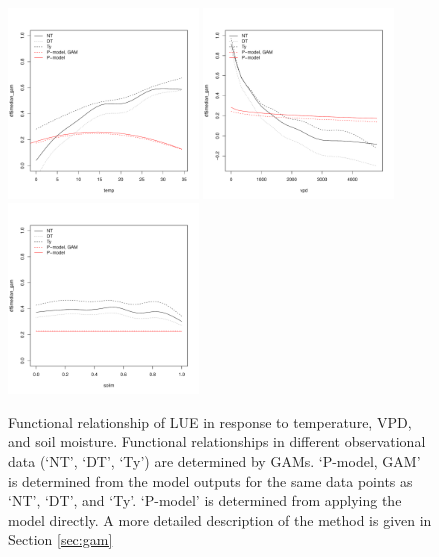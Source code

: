 \documentclass{myreport}
\begin{document}
\begin{figure}[!ht]
\includegraphics[width=0.45\textwidth]{fig/functionalrel_gam_temp.pdf}
\includegraphics[width=0.45\textwidth]{fig/functionalrel_gam_vpd.pdf}
\includegraphics[width=0.45\textwidth]{fig/functionalrel_gam_soilm.pdf}
    \caption{Functional relationship of LUE in response to temperature, VPD, and soil moisture. Functional relationships in different observational data (`NT', `DT', `Ty') are determined by GAMs. `P-model, GAM' is determined from the model outputs for the same data points as `NT', `DT', and `Ty'. `P-model' is determined from applying the model directly. A more detailed description of the method is given in Section \ref{sec:gam}}
    \label{fig:functionalrel}
\end{figure}
\end{document}
